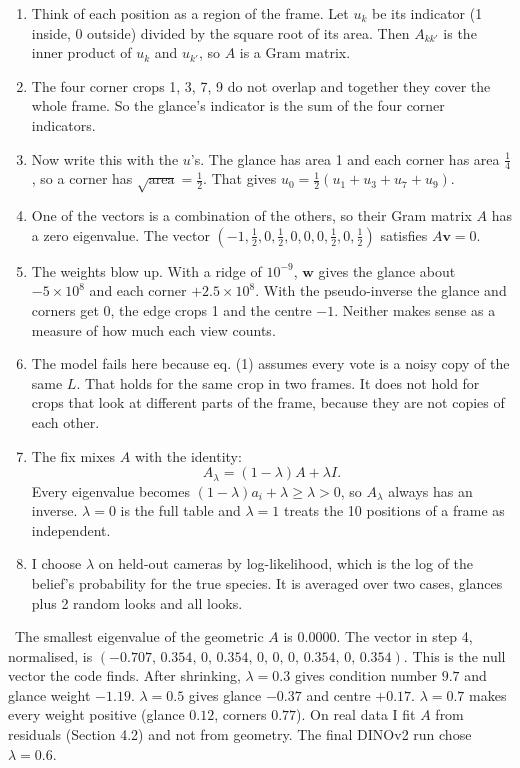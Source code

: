\documentclass[11pt]{article}
\newcommand{\Steps}{\par\smallskip\noindent{\sffamily\bfseries\color{headblue}Steps.}\par}
\newcommand{\CheckNum}{\par\smallskip\noindent{\sffamily\bfseries\color{headblue}Check with numbers.}\ }
\newenvironment{steps}{\begin{enumerate}[label=\textbf{\arabic*.},leftmargin=2em,itemsep=6pt]}{\end{enumerate}}
\begin{document}
\Steps
\begin{steps}
  \item Think of each position as a region of the frame. Let $u_k$ be its indicator (1 inside, 0 outside) divided by the square root of its area. Then $A_{kk'}$ is the inner product of $u_k$ and $u_{k'}$, so $A$ is a Gram matrix.
  \item The four corner crops 1, 3, 7, 9 do not overlap and together they cover the whole frame. So the glance's indicator is the sum of the four corner indicators.
  \item Now write this with the $u$'s. The glance has area 1 and each corner has area $\tfrac14$, so a corner has $\sqrt{\text{area}}=\tfrac12$. That gives $u_0=\tfrac12(u_1+u_3+u_7+u_9)$.
  \item One of the vectors is a combination of the others, so their Gram matrix $A$ has a zero eigenvalue. The vector $(-1,\tfrac12,0,\tfrac12,0,0,0,\tfrac12,0,\tfrac12)$ satisfies $A\bm v=0$.
  \item The weights blow up. With a ridge of $10^{-9}$, $\bm w$ gives the glance about $-5\times10^8$ and each corner $+2.5\times10^8$. With the pseudo-inverse the glance and corners get 0, the edge crops 1 and the centre $-1$. Neither makes sense as a measure of how much each view counts.
  \item The model fails here because eq. (1) assumes every vote is a noisy copy of the same $L$. That holds for the same crop in two frames. It does not hold for crops that look at different parts of the frame, because they are not copies of each other.
  \item The fix mixes $A$ with the identity:
  \[ A_\lambda=(1-\lambda)A+\lambda I. \]
  Every eigenvalue becomes $(1-\lambda)a_i+\lambda\ge\lambda>0$, so $A_\lambda$ always has an inverse. $\lambda=0$ is the full table and $\lambda=1$ treats the 10 positions of a frame as independent.
  \item I choose $\lambda$ on held-out cameras by log-likelihood, which is the log of the belief's probability for the true species. It is averaged over two cases, glances plus 2 random looks and all looks.
\end{steps}

\CheckNum The smallest eigenvalue of the geometric $A$ is $0.0000$. The vector in step 4, normalised, is $(-0.707,\,0.354,\,0,\,0.354,\,0,\,0,\,0,\,0.354,\,0,\,0.354)$. This is the null vector the code finds. After shrinking, $\lambda=0.3$ gives condition number $9.7$ and glance weight $-1.19$. $\lambda=0.5$ gives glance $-0.37$ and centre $+0.17$. $\lambda=0.7$ makes every weight positive (glance $0.12$, corners $0.77$). On real data I fit $A$ from residuals (Section 4.2) and not from geometry. The final DINOv2 run chose $\lambda=0.6$.
\end{document}
